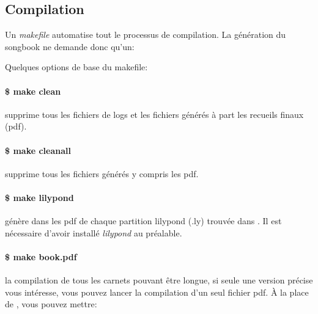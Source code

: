 \documentclass[versionenligne]{framabook}
\begin{document}
\subsection{Compilation}

Un \emph{makefile} automatise tout le processus de compilation. La
génération du songbook ne demande donc qu'un: 

Quelques options de base du makefile:

\paragraph{\$ make clean} 
supprime tous les fichiers de logs et les fichiers générés à part les
recueils finaux (pdf).

\paragraph{\$ make cleanall}
supprime tous les fichiers générés y compris les pdf.

\paragraph{\$ make lilypond}
génère dans  les pdf de chaque partition lilypond (.ly)
trouvée dans . Il est nécessaire d'avoir installé
\emph{lilypond} au préalable.

\paragraph{\$ make book.pdf}
la compilation de tous les carnets pouvant être longue, si seule une
version précise vous intéresse, vous pouvez lancer la compilation d'un
seul fichier pdf. À la place de
, vous pouvez mettre:
\end{document}
